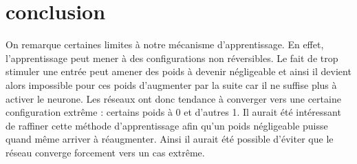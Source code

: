 \section{conclusion}
On remarque certaines limites à notre mécanisme d'apprentissage. En effet,
l'apprentissage peut mener à des configurations non réversibles. Le fait de
trop stimuler une entrée peut amener des poids à devenir négligeable et ainsi
il devient alors impossible pour ces poids d'augmenter par la suite car il
ne suffise plus à activer le neurone. Les réseaux ont donc tendance à converger
vers une certaine configuration extrême : certains poids à 0 et d'autres 1. Il
aurait été intéressant de raffiner cette méthode d'apprentissage afin qu'un 
poids négligeable puisse quand même arriver à réaugmenter. Ainsi il aurait
été possible d'éviter que le réseau converge forcement vers un cas extrême.
